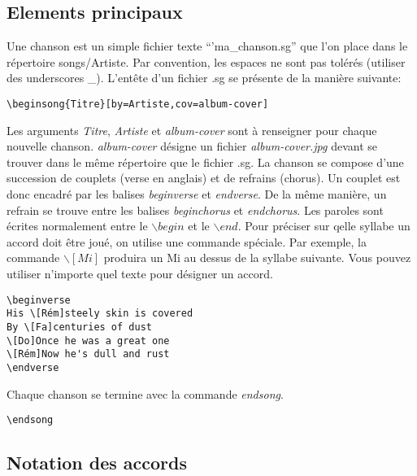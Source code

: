 \documentclass[a4paper,twoside]{article}
\begin{document}
\subsection{Elements principaux}

Une chanson est un simple fichier texte ``'ma\_chanson.sg'' que l'on
place dans le répertoire songs/Artiste. Par convention, les espaces ne
sont pas tolérés (utiliser des underscores \_). L'entête d'un fichier
.sg se présente de la manière suivante:

\begin{verbatim}
\beginsong{Titre}[by=Artiste,cov=album-cover]
\end{verbatim}

Les arguments \emph{Titre}, \emph{Artiste} et \emph{album-cover} sont
à renseigner pour chaque nouvelle chanson. \emph{album-cover} désigne
un fichier \emph{album-cover.jpg} devant se trouver dans le même
répertoire que le fichier .sg.  La chanson se compose d'une succession
de couplets (verse en anglais) et de refrains (chorus). Un couplet est
donc encadré par les balises \emph{beginverse} et \emph{endverse}. De
la même manière, un refrain se trouve entre les balises
\emph{beginchorus} et \emph{endchorus}.  Les paroles sont écrites
normalement entre le $\backslash begin$ et le $\backslash end$. Pour
préciser sur qelle syllabe un accord doit être joué, on utilise une
commande spéciale. Par exemple, la commande $\backslash [Mi]$ produira
un Mi au dessus de la syllabe suivante. Vous pouvez utiliser n'importe
quel texte pour désigner un accord.

\begin{verbatim}
\beginverse
His \[Rém]steely skin is covered
By \[Fa]centuries of dust
\[Do]Once he was a great one
\[Rém]Now he's dull and rust
\endverse
\end{verbatim}

Chaque chanson se termine avec la commande \emph{endsong}.

\begin{verbatim}
\endsong
\end{verbatim}

\subsection{Notation des accords}\label{sect:about}
\end{document}
